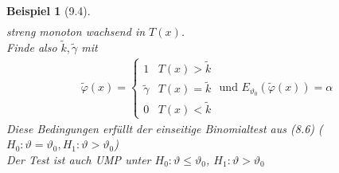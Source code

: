 \documentclass[a4paper,openany]{book}
\theoremstyle{mytheoremstyle}
\newtheorem*{bei}{Beispiel}
\theoremstyle{mytheoremstyle2}
\begin{document}
\begin{bei}[9.4]
\begin{align*}
  \end{align*}
  streng monoton wachsend in $T(x)$. \\
  Finde also $\tilde{k},\tilde{\gamma }$ mit 
  \begin{align*}
    \tilde{\varphi }(x)=\begin{cases}
      1 &T(x)> \tilde{k}\\
      \tilde{\gamma }&T(x)=\tilde{k} \\
      0&T(x)<\tilde{k}
  \end{cases}\text{ und }E _{\vartheta _0}(\tilde{\varphi} (x))=\alpha 
  \end{align*}
  Diese Bedingungen erfüllt der einseitige Binomialtest aus (8.6) ($H_0:\vartheta =\vartheta _0,H_1:\vartheta >\vartheta _0$) \\
  Der Test ist auch UMP unter $H_0:\vartheta  \leq \vartheta _0$, $H_1:\vartheta >\vartheta _0$  
\end{bei}
\end{document}
